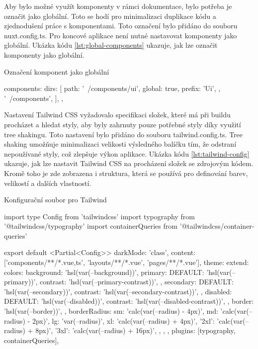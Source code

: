 Aby bylo možné využít komponenty v rámci dokumentace, bylo potřeba je označit jako globální. Toto se hodí pro minimalizaci duplikace kódu a zjednodušení práce s komponentami. Toto označení bylo přidáno do souboru nuxt.config.ts. Pro koncové aplikace není nutné nastavovat komponenty jako globální. Ukázka kódu \ref{lst:global-components} ukazuje, jak lze označit komponenty jako globální.

\begin{listing}[H]
    \caption{Označení komponent jako globální}
    \label{lst:global-components}
    \begin{code}
components: {
  dirs: [
    {
      path: '~/components/ui',
      global: true,
      prefix: 'Ui',
    },
    '~/components',
  ],
},
\end{code}
\end{listing}

Nastavení Tailwind CSS vyžadovalo specifikaci složek, které má při buildu procházet a hledat styly, aby byly zahrnuty pouze potřebné styly díky využití tree shakingu. Toto nastavení bylo přidáno do souboru tailwind.config.ts. Tree shaking umožňuje minimalizaci velikosti výsledného balíčku tím, že odstraní nepoužívané styly, což zlepšuje výkon aplikace. Ukázka kódu \ref{lst:tailwind-config} ukazuje, jak lze nastavit Tailwind CSS na procházení složek se zdrojovým kódem. Kromě toho je zde zobrazena i struktura, která se používá pro definování barev, velikostí a dalších vlastností.

\begin{listing}[H]
    \caption{Konfigurační soubor pro Tailwind}
    \label{lst:tailwind-config}
    \begin{code}
import type { Config } from 'tailwindcss'
import typography from '@tailwindcss/typography'
import containerQueries from '@tailwindcss/container-queries'

export default <Partial<Config>>{
    darkMode: 'class',
    content: ['components/**/*.{vue,ts}', 'layouts/**/*.vue', 'pages/**/*.vue'],
    theme: {
        extend: {
            colors: {
                background: 'hsl(var(--background))',
                primary: {
                    DEFAULT: 'hsl(var(--primary))',
                    contrast: 'hsl(var(--primary-contrast))',
                },
                secondary: {
                    DEFAULT: 'hsl(var(--secondary))',
                    contrast: 'hsl(var(--secondary-contrast))',
                },
                disabled: {
                    DEFAULT: 'hsl(var(--disabled))',
                    contrast: 'hsl(var(--disabled-contrast))',
                },
                border: 'hsl(var(--border))',
            },
            borderRadius: {
                sm: 'calc(var(--radius) - 4px)',
                md: 'calc(var(--radius) - 2px)',
                lg: 'var(--radius)',
                xl: 'calc(var(--radius) + 4px)',
                '2xl': 'calc(var(--radius) + 8px)',
                '3xl': 'calc(var(--radius) + 16px)',
            },
        },
    },
    plugins: [typography, containerQueries],
}
    \end{code}
\end{listing}

